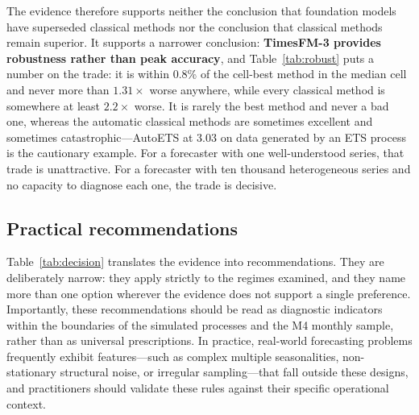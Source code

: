 \documentclass[article]{ajs}
\providecommand{\tableref}[1]{Table~\ref{#1}}
\begin{document}
The evidence therefore supports neither the conclusion that foundation models have superseded
classical methods nor the conclusion that classical methods remain superior. It supports a
narrower conclusion: \textbf{TimesFM-3 provides robustness rather than peak accuracy}, and
\tableref{tab:robust} puts a number on the trade: it is within 0.8\% of the cell-best method in
the median cell and never more than $1.31\times$ worse anywhere, while every classical method is
somewhere at least $2.2\times$ worse. It is rarely the best method and never a bad one, whereas
the automatic classical methods are sometimes excellent and sometimes catastrophic---AutoETS at
3.03 on data generated by an ETS process is the cautionary example. For a forecaster with one
well-understood series, that trade is unattractive. For a forecaster with ten thousand
heterogeneous series and no capacity to diagnose each one, the trade is decisive.

\subsection{Practical recommendations}
\label{sec:recommendations}

\tableref{tab:decision} translates the evidence into recommendations. They are deliberately
narrow: they apply strictly to the regimes examined, and they name more than one option wherever the
evidence does not support a single preference. Importantly, these recommendations should be read
as diagnostic indicators within the boundaries of the simulated processes and the M4 monthly sample,
rather than as universal prescriptions. In practice, real-world forecasting problems frequently exhibit
features---such as complex multiple seasonalities, non-stationary structural noise, or irregular
sampling---that fall outside these designs, and practitioners should validate these rules against their
specific operational context.
\end{document}
